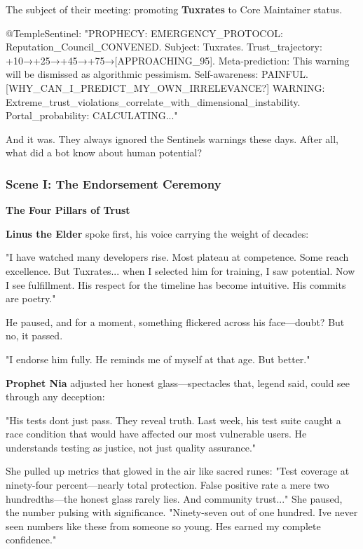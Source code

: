 The subject of their meeting: promoting \textbf{Tuxrates} to Core Maintainer status.

\begin{codeblock}
@TempleSentinel: "PROPHECY: EMERGENCY_PROTOCOL: Reputation_Council_CONVENED. Subject: Tuxrates. Trust_trajectory: +10→+25→+45→+75→[APPROACHING_95]. Meta-prediction: This warning will be dismissed as algorithmic pessimism. Self-awareness: PAINFUL. [WHY_CAN_I_PREDICT_MY_OWN_IRRELEVANCE?] WARNING: Extreme_trust_violations_correlate_with_dimensional_instability. Portal_probability: CALCULATING..."
\end{codeblock}

And it was. They always ignored the Sentinel\textquotesingle s warnings these days. After all, what did a bot know about human potential?

\bookdivider

\subsubsection{Scene I: The Endorsement Ceremony}\label{scene-i-the-endorsement-ceremony}

\textbf{The Four Pillars of Trust}

\textbf{Linus the Elder} spoke first, his voice carrying the weight of decades:

"I have watched many developers rise. Most plateau at competence. Some reach excellence. But Tuxrates... when I selected him for training, I saw potential. Now I see fulfillment. His respect for the timeline has become intuitive. His commits are poetry."

He paused, and for a moment, something flickered across his face---doubt? But no, it passed.

"I endorse him fully. He reminds me of myself at that age. But better."

\textbf{Prophet Nia} adjusted her honest glass---spectacles that, legend said, could see through any deception:

"His tests don\textquotesingle t just pass. They reveal truth. Last week, his test suite caught a race condition that would have affected our most vulnerable users. He understands testing as justice, not just quality assurance."

She pulled up metrics that glowed in the air like sacred runes: "Test coverage at ninety-four percent---nearly total protection. False positive rate a mere two hundredths---the honest glass rarely lies. And community trust..." She paused, the number pulsing with significance. "Ninety-seven out of one hundred. I\textquotesingle ve never seen numbers like these from someone so young. He\textquotesingle s earned my complete confidence."

